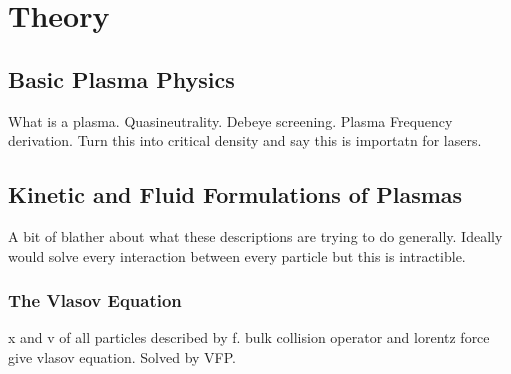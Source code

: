 \chapter{Theory}%
\label{chap:Theory}


\section{Basic Plasma Physics}%
\label{sec:theory_plasma_phys}

What is a plasma.
Quasineutrality.
Debeye screening.
Plasma Frequency derivation.
Turn this into critical density and say this is importatn for lasers.

\section{Kinetic and Fluid Formulations of Plasmas}%
\label{sec:theory_kin_fluid_plasmas}

A bit of blather about what these descriptions are trying to do generally.
Ideally would solve every interaction between every particle but this is intractible.

\subsection{The Vlasov Equation}%
\label{sec:theory_vlasov}

x and v of all particles described by f.
bulk collision operator and lorentz force give vlasov equation.
Solved by VFP.

